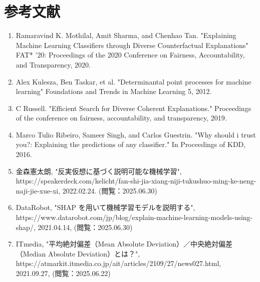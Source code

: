 \documentclass[dvipdfmx]{jreport}
\begin{document}
\section{参考文献}
\begin{enumerate}
    \renewcommand{\labelenumi}{[\theenumi]}
    \item Ramaravind K. Mothilal, Amit Sharma, and Chenhao Tan. "Explaining Machine Learning Classifiers through Diverse Counterfactual Explanations" FAT* '20: Proceedings of the 2020 Conference on Fairness, Accountability, and Transparency, 2020.
    \item Alex Kulesza, Ben Taskar, et al. "Determinantal point processes for machine learning" Foundations and Trends in Machine Learning 5, 2012. \label{DPP}
    \item C Russell. "Efficient Search for Diverse Coherent Explanations." Proceedings of the conference on fairness, accountability, and transparency, 2019. \label{mixedcf}
    \item Marco Tulio Ribeiro, Sameer Singh, and Carlos Guestrin. "Why should i trust you?: Explaining the predictions of any classifier." In Proceedings of KDD, 2016. \label{LIME}
    \item 金森憲太朗, "反実仮想に基づく説明可能な機械学習", https://speakerdeck.com/kelicht/fan-shi-jia-xiang-niji-tukushuo-ming-ke-neng-naji-jie-xue-xi, 2022.02.24. (閲覧：2025.06.30) \label{kelicht}
    \item DataRobot, "SHAP を用いて機械学習モデルを説明する", https://www.datarobot.com/jp/blog/explain-machine-learning-models-using-shap/, 2021.04.14, (閲覧：2025.06.30) \label{shap}
    \item ITmedia, "平均絶対偏差（Mean Absolute Deviation）／中央絶対偏差（Median Absolute Deviation）とは？", https://atmarkit.itmedia.co.jp/ait/articles/2109/27/news027.html, 2021.09.27, (閲覧：2025.06.22) \label{mad}
\end{enumerate}
\end{document}
